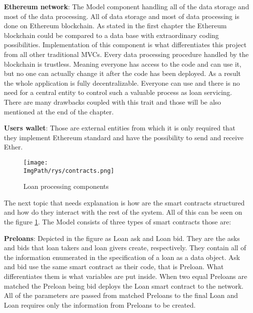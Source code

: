 \documentclass[a4paper,12pt,twoside,openany]{report}
\newcommand{\ImgPath}{.}
\begin{document}
\textbf{Ethereum network}: The Model component handling all of the data storage and most of the data processing. All of data storage and most of data processing is done on Ethereum blockchain. As stated in the first chapter the Ethereum blockchain could be compared to a data base with extraordinary coding possibilities. Implementation of this component is what differentiates this project from all other traditional MVCs. Every data processing procedure handled by the blockchain is trustless. Meaning everyone has access to the code and can use it, but no one can actually change it after the code has been deployed. As a result the whole application is fully decentralizable. Everyone can use and there is no need for a central entity to control such a valuable process as loan servicing. There are many drawbacks coupled with this trait and those will be also mentioned at the end of the chapter.

\textbf{Users wallet}: Those are external entities from which it is only required that they implement Ethereum standard and have the possibility to send and receive Ether.

\begin{figure}[!htbp]
	\begin{center}
\centering
\texttt{[image: \\ImgPath/rys/contracts.png]}
\end{center}
	\caption{Loan processing components}
	\label{loan components}
\end{figure}

The next topic that needs explanation is how are the smart contracts structured and how do they interact with the rest of the system. All of this can be seen on the figure \ref{loan components}. The Model consists of three types of smart contracts those are:

\textbf{Preloans}: Depicted in the figure as Loan ask and Loan bid. They are the asks and bids that loan takers and loan givers create, respectively. They contain all of the information enumerated in the specification of a loan as a data object. Ask and bid use the same smart contract as their code, that is Preloan. What differentiates them is what variables are put inside. When two equal Preloans are matched the Preloan being bid deploys the Loan smart contract to the network. All of the parameters are passed from matched Preloans to the final Loan and Loan requires only the information from Preloans to be created. 
\end{document}
